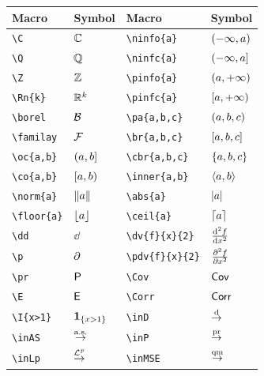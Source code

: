 \documentclass[11pt,a4paper]{article}
\begin{document}
\begin{table}[h]
\centering
\setlength{\arrayrulewidth}{1pt} \setlength{\tabcolsep}{10pt}     \renewcommand{\arraystretch}{1.5} \begin{tabular}{|>{\centering\arraybackslash}m{3cm}|>{\centering\arraybackslash}m{3cm}||>{\centering\arraybackslash}m{3cm}|>{\centering\arraybackslash}m{3cm}|}
\hline
\textbf{Macro} & \textbf{Symbol} & \textbf{Macro} & \textbf{Symbol} \\
\hline
\texttt{\textbackslash C}  & $ \mathbb{C} $   & \texttt{\textbackslash ninfo\{a\}}    & $(-\infty,a)$ \\
\texttt{\textbackslash Q}  & $ \mathbb{Q} $   & \texttt{\textbackslash ninfc\{a\}}    & $(-\infty,a]$ \\
\texttt{\textbackslash Z}  & $ \mathbb{Z} $   & \texttt{\textbackslash pinfo\{a\}}    & $(a,+\infty)$ \\
\texttt{\textbackslash Rn\{k\}}  & $ \mathbb{R}^{k} $   & \texttt{\textbackslash  pinfc\{a\}}    & $[a,+\infty)$ \\
\texttt{\textbackslash borel}  & $ \mathcal{B} $   & \texttt{\textbackslash pa\{a,b,c\}}    & $\lparen a,b,c\rparen$ \\
\texttt{\textbackslash familay}  & $ \mathcal{F} $   & \texttt{\textbackslash br\{a,b,c\}}    & $[a,b,c]$ \\
\texttt{\textbackslash oc\{a,b\}}  & $ \lparen a,b] $   & \texttt{\textbackslash cbr\{a,b,c\}}    & $\{a,b,c\}$ \\
\texttt{\textbackslash co\{a,b\}}  & $ [a,b\rparen $   & \texttt{\textbackslash inner\{a,b\}}  & $ \langle a,b\rangle $  \\
\hline

 \texttt{\textbackslash norm\{a\}}    & $\Vert a\Vert$ & \texttt{\textbackslash abs\{a\}}    & $\lvert a\rvert$ \\
\texttt{\textbackslash floor\{a\}}  & $ \lfloor a\rfloor $   & \texttt{\textbackslash ceil\{a\}}    & $\lceil a\rceil$ \\


\texttt{\textbackslash dd}  & $ \dd $   & \texttt{\textbackslash dv\{f\}\{x\}\{2\}}    & $\frac{\textnormal{d}^{2} {f}}{\textnormal{d} {x}^{2}}$ \\
\texttt{\textbackslash p}  & $ \partial $   & \texttt{\textbackslash pdv\{f\}\{x\}\{2\}}    & $\frac{\partial^{2} {f}}{\partial {x}^{2}}$ \\
  
\texttt{\textbackslash pr}  & $ \mathsf{P} $   & \texttt{\textbackslash Cov}    & ${\mathsf{Cov}}$ \\
\texttt{\textbackslash E}   & $\mathsf{E}$   & \texttt{\textbackslash Corr}   & ${\mathsf{Corr}}$ \\
\texttt{\textbackslash I\{x>1\}} & $\mathbf{1}_{\{x>1\}}$ & \texttt{\textbackslash inD} & $\overset{ \textnormal{d} }{\rightarrow}$ \\
\texttt{\textbackslash inAS}   & $\overset{ \textnormal{a.s.} }{\rightarrow}$ & \texttt{\textbackslash inP} & $\overset{ \textnormal{pr} }{\rightarrow}$ \\
\texttt{\textbackslash inLp}   & $\overset{ \mathcal{L}^p }{\rightarrow}$ & \texttt{\textbackslash inMSE} & $\overset{ \textnormal{qm} }{\rightarrow}$ \\
\hline


\end{tabular}
\end{table}
\end{document}
